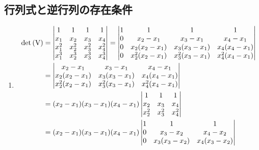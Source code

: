 \subsection{行列式と逆行列の存在条件}
  \vspace{1mm}
  \begin{enumerate}[label=(\roman*)]
    \item
      \begin{align}
        \det{(\matsym{V})} &=
          \begin{vmatrix}
            1 & 1 & 1 & 1 \\
            x_1 & x_2 & x_3 & x_4 \\
            x_1^2 & x_2^2 & x_3^2 & x_4^2 \\
            x_1^3 & x_2^3 & x_3^3 & x_4^3
          \end{vmatrix}
          =
          \begin{vmatrix}
            1 & 1 & 1 & 1 \\
            0 & x_2 - x_1 & x_3 - x_1 & x_4 - x_1 \\
            0 & x_2 (x_2 - x_1) & x_3 (x_3 - x_1) & x_4 (x_4 - x_1)\\
            0 & x_2^2 (x_2 - x_1) & x_3^2 (x_3 - x_1) & x_4^2 (x_4 - x_1) 
          \end{vmatrix}\\
          &=
          \begin{vmatrix}
            x_2 - x_1 & x_3 - x_1 & x_4 - x_1 \\
            x_2 (x_2 - x_1) & x_3 (x_3 - x_1) & x_4 (x_4 - x_1)\\
            x_2^2 (x_2 - x_1) & x_3^2 (x_3 - x_1) & x_4^2 (x_4 - x_1) 
          \end{vmatrix}\\
          &= (x_2 - x_1) (x_3 - x_1) (x_4 - x_1)
          \begin{vmatrix}
            1 & 1 & 1 \\
            x_2 & x_3 & x_4\\
            x_2^2 & x_3^2 & x_4^2
          \end{vmatrix}\\
          &= (x_2 - x_1) (x_3 - x_1) (x_4 - x_1)
          \begin{vmatrix}
            1 & 1 & 1 \\
            0 & x_3 - x_2 & x_4 - x_2\\
            0 & x_3 (x_3 - x_2) & x_4 (x_3 - x_2)
          \end{vmatrix}\\

\end{align}
\end{enumerate}
